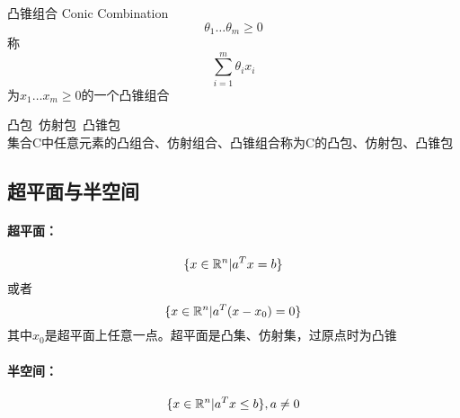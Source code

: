 \documentclass{mytemplate}
\begin{document}
\begin{definition}{凸锥组合 Conic Combination}
    \[\theta_1 \dots \theta_m \geq 0\]
    称
    \[
        \sum_{i=1}^{m} \theta_i x_i
    \]
    为$x_1 \dots x_m \geq 0$的一个凸锥组合
\end{definition}

\begin{definition}{凸包\ 仿射包\ 凸锥包}\\
    集合C中任意元素的凸组合、仿射组合、凸锥组合称为C的凸包、仿射包、凸锥包
\end{definition}
\subsection{超平面与半空间}
\paragraph*{超平面：}
\[
    \{x \in \mathbb{R}^n | a^T x=b\}  
\]
或者
\[
    \{x \in \mathbb{R}^n | a^T (x-x_0) =0\}  
\]
其中$x_0$是超平面上任意一点。超平面是凸集、仿射集，过原点时为凸锥

\paragraph*{半空间：}
\[
\{x \in \mathbb{R}^n | a^T x \leq b\} , a \neq 0 
\]
\end{document}
